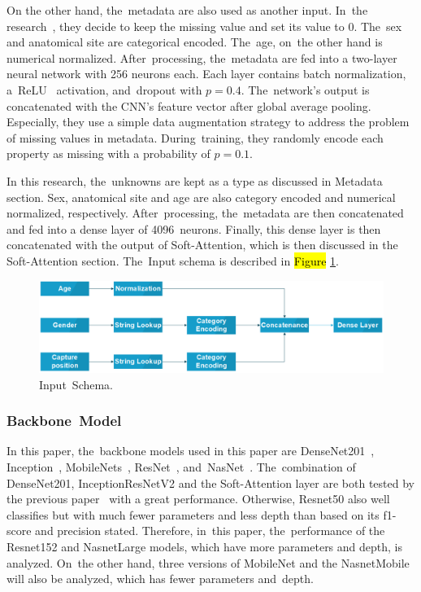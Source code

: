 \documentclass[sensors,article,accept,pdftex,moreauthors]{Definitions/mdpi}
\begin{document}
On the other hand, the~metadata are also used as another input. In~the research~\cite{03910}, they decide to keep the missing value and set its value to $0$. The~sex and anatomical site are categorical encoded. The~age, on~the other hand is numerical normalized. After~processing, the~metadata are fed into a two-layer neural network with 256 neurons each. Each layer contains batch normalization, a~ReLU~\cite{08375} activation, and~dropout with $p = 0.4$. The~network’s output is concatenated with the CNN’s feature vector after global average pooling. Especially, they use a simple data augmentation strategy to address the problem of missing values in metadata. During~training, they randomly encode each property as missing with a probability of $p = 0.1$. 

In this research, the~unknowns are kept as a type as discussed in Metadata section. Sex, anatomical site and age are also category encoded and numerical normalized, respectively. After~processing, the~metadata are then concatenated and fed into a dense layer of 4096~neurons. Finally, this dense layer is then concatenated with the output of Soft-Attention, which is then discussed in the Soft-Attention section. The~Input schema is described in \hl{Figure} %
 \ref{fig:input-schema}.

\begin{figure}[H]
	\includegraphics[width=1\linewidth]{"Definitions/Input Schema"}
	\caption{Input~Schema.}
	\label{fig:input-schema}
\end{figure}
\unskip

\subsubsection{Backbone~Model}
In this paper, the~backbone models used in this paper are DenseNet201~\cite{06993}, Inception~\cite{00567}, MobileNets~\cite{04861,04381,02244}, ResNet~\cite{03385,05027}, and~NasNet~\cite{07012}. The~combination of DenseNet201, InceptionResNetV2 and the Soft-Attention layer are both tested by the previous paper~\cite{03358} with a great performance. Otherwise, Resnet50 also well classifies but with much fewer parameters and less depth than based on its f1-score and precision stated. Therefore, in~this paper, the~performance of the Resnet152 and NasnetLarge models, which have more parameters and depth, is analyzed. On~the other hand, three versions of MobileNet and the NasnetMobile will also be analyzed, which has fewer parameters and~depth. 
\end{document}
